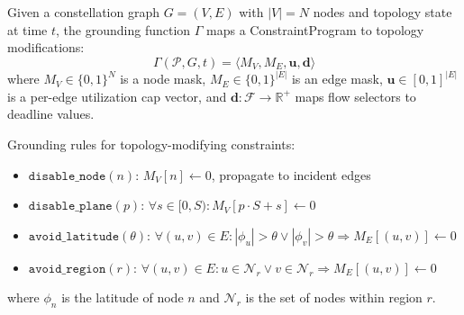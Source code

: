 \begin{definition}
Given a constellation graph $G = (V, E)$ with $|V| = N$ nodes and topology
state at time $t$, the grounding function $\Gamma$ maps a ConstraintProgram
to topology modifications:
\begin{equation}
\Gamma(\mathcal{P}, G, t) = \langle M_V, M_E, \mathbf{u}, \mathbf{d} \rangle
\end{equation}
where $M_V \in \{0,1\}^N$ is a node mask, $M_E \in \{0,1\}^{|E|}$ is an edge mask,
$\mathbf{u} \in [0,1]^{|E|}$ is a per-edge utilization cap vector, and
$\mathbf{d}: \mathcal{F} \to \mathbb{R}^+$ maps flow selectors to deadline values.

Grounding rules for topology-modifying constraints:
\begin{itemize}
\item $\texttt{disable\_node}(n)$: $M_V[n] \leftarrow 0$, propagate to incident edges
\item $\texttt{disable\_plane}(p)$: $\forall s \in [0, S): M_V[p \cdot S + s] \leftarrow 0$
\item $\texttt{avoid\_latitude}(\theta)$: $\forall (u,v) \in E: |\phi_u| > \theta \lor |\phi_v| > \theta \Rightarrow M_E[(u,v)] \leftarrow 0$
\item $\texttt{avoid\_region}(r)$: $\forall (u,v) \in E: u \in \mathcal{N}_r \lor v \in \mathcal{N}_r \Rightarrow M_E[(u,v)] \leftarrow 0$
\end{itemize}
where $\phi_n$ is the latitude of node $n$ and $\mathcal{N}_r$ is the set of nodes
within region $r$.
\end{definition}

